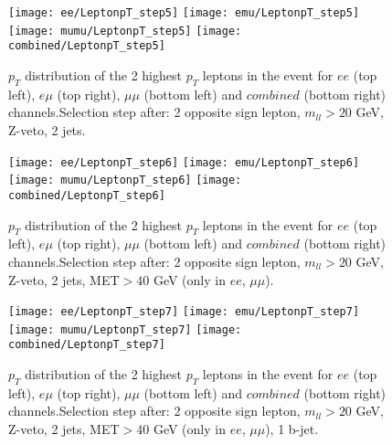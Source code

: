 \clearpage
\newpage


\begin{figure}
  \texttt{[image: ee/LeptonpT\_step5]}
  \texttt{[image: emu/LeptonpT\_step5]}\\
  \texttt{[image: mumu/LeptonpT\_step5]}
  \texttt{[image: combined/LeptonpT\_step5]}
\caption{$p_T$ distribution of the 2 highest $p_T$ leptons in the event for $ee$ (top left), $e\mu$ (top right), $\mu\mu$ (bottom left) and $combined$ (bottom right) channels.\newline Selection step after: 2 opposite sign lepton, $m_{ll}>20$ GeV, Z-veto, 2 jets.}
\end{figure}

\clearpage
\newpage


\begin{figure}
  \texttt{[image: ee/LeptonpT\_step6]}
  \texttt{[image: emu/LeptonpT\_step6]}\\
  \texttt{[image: mumu/LeptonpT\_step6]}
  \texttt{[image: combined/LeptonpT\_step6]}
\caption{$p_T$ distribution of the 2 highest $p_T$ leptons in the event for $ee$ (top left), $e\mu$ (top right), $\mu\mu$ (bottom left) and $combined$ (bottom right) channels.\newline Selection step after: 2 opposite sign lepton, $m_{ll}>20$ GeV, Z-veto, 2 jets, MET$>40$ GeV (only in $ee$, $\mu\mu$).}
\end{figure}

\clearpage
\newpage

\begin{figure}
  \texttt{[image: ee/LeptonpT\_step7]}
  \texttt{[image: emu/LeptonpT\_step7]}\\
  \texttt{[image: mumu/LeptonpT\_step7]}
  \texttt{[image: combined/LeptonpT\_step7]}
\caption{$p_T$ distribution of the 2 highest $p_T$ leptons in the event for $ee$ (top left), $e\mu$ (top right), $\mu\mu$ (bottom left) and $combined$ (bottom right) channels.\newline Selection step after: 2 opposite sign lepton, $m_{ll}>20$ GeV, Z-veto, 2 jets, MET$>40$ GeV (only in $ee$, $\mu\mu$), 1 b-jet.}
\end{figure}

